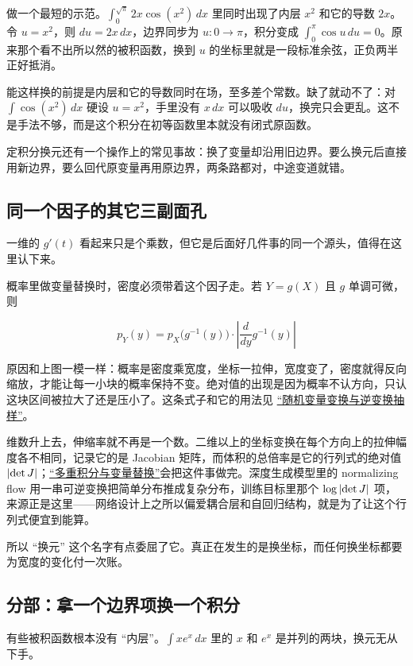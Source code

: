 做一个最短的示范。\(\int_0^{\sqrt\pi} 2x\cos(x^2)\,dx\) 里同时出现了内层 \(x^2\) 和它的导数 \(2x\)。令 \(u=x^2\)，则 \(du=2x\,dx\)，边界同步为 \(u:0\to\pi\)，积分变成 \(\int_0^\pi\cos u\,du=0\)。原来那个看不出所以然的被积函数，换到 \(u\) 的坐标里就是一段标准余弦，正负两半正好抵消。

能这样换的前提是内层和它的导数同时在场，至多差个常数。缺了就动不了：对 \(\int\cos(x^2)\,dx\) 硬设 \(u=x^2\)，手里没有 \(x\,dx\) 可以吸收 \(du\)，换完只会更乱。这不是手法不够，而是这个积分在初等函数里本就没有闭式原函数。

定积分换元还有一个操作上的常见事故：换了变量却沿用旧边界。要么换元后直接用新边界，要么回代原变量再用原边界，两条路都对，中途变道就错。

\subsection{同一个因子的其它三副面孔}

一维的 \(g'(t)\) 看起来只是个乘数，但它是后面好几件事的同一个源头，值得在这里认下来。

概率里做变量替换时，密度必须带着这个因子走。若 \(Y=g(X)\) 且 \(g\) 单调可微，则

\[
p_Y(y)=p_X\bigl(g^{-1}(y)\bigr)\cdot\left\lvert\frac{d}{dy}g^{-1}(y)\right\rvert
\]

原因和上图一模一样：概率是密度乘宽度，坐标一拉伸，宽度变了，密度就得反向缩放，才能让每一小块的概率保持不变。绝对值的出现是因为概率不认方向，只认这块区间被拉大了还是压小了。这条式子和它的用法见 \hyperref[sec:05-Probability/03-Random-Variables/04]{``随机变量变换与逆变换抽样''}。

维数升上去，伸缩率就不再是一个数。二维以上的坐标变换在每个方向上的拉伸幅度各不相同，记录它的是 Jacobian 矩阵，而体积的总倍率是它的行列式的绝对值 \(\left|\det J\right|\)；\hyperref[sec:02-Calculus/06-Multivariable-Calculus/07]{``多重积分与变量替换''}会把这件事做完。深度生成模型里的 normalizing flow 用一串可逆变换把简单分布推成复杂分布，训练目标里那个 \(\log\left|\det J\right|\) 项，来源正是这里——网络设计上之所以偏爱耦合层和自回归结构，就是为了让这个行列式便宜到能算。

所以 ``换元'' 这个名字有点委屈了它。真正在发生的是换坐标，而任何换坐标都要为宽度的变化付一次账。

\subsection{分部：拿一个边界项换一个积分}

有些被积函数根本没有 ``内层''。\(\int x e^x\,dx\) 里的 \(x\) 和 \(e^x\) 是并列的两块，换元无从下手。

